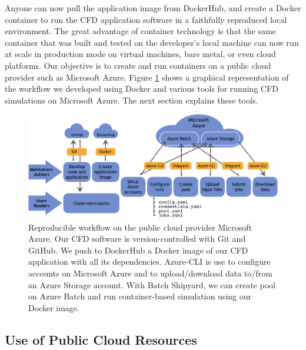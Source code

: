 \documentclass[10pt,journal,compsoc]{IEEEtran}
\begin{document}
\noindent Anyone can now pull the application image from DockerHub, and create a Docker container to run the CFD application software in a faithfully reproduced local environment.
The great advantage of container technology is that the same container that was built and tested on the developer's local machine can now run at scale in production mode on virtual machines, bare metal, or even cloud platforms.
Our objective is to create and run containers on a public cloud provider such as Microsoft Azure.
Figure \ref{fig:cloud_workflow} shows a graphical representation of the workflow we developed using Docker and various tools for running CFD simulations on Microsoft Azure.
The next section explains these tools. 

\begin{figure}[b]
    \centering
    \includegraphics[width=16cm]{figures/cloud_workflow.png}
    \caption{Reproducible workflow on the public cloud provider Microsoft Azure. Our CFD software is version-controlled with Git and GitHub. We push to DockerHub a Docker image of our CFD application with all its dependencies. Azure-CLI is use to configure accounts on Microsoft Azure and to upload/download data to/from an Azure Storage account. With Batch Shipyard, we can create pool on Azure Batch and run container-based simulation using our Docker image.}
    \label{fig:cloud_workflow}
\end{figure}

\subsection{Use of Public Cloud Resources}
\end{document}
